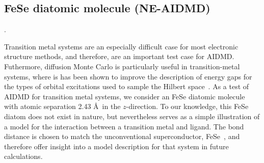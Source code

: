 \subsection{FeSe diatomic molecule (NE-AIDMD)}
.

Transition metal systems are an especially difficult case for most electronic structure methods, and therefore, are an 
important test case for AIDMD. Futhermore, diffusion Monte Carlo is particularly useful in transition-metal systems, where is has been shown to improve the description of energy gaps for the types of orbital excitations used to sample the Hilbert space~\cite{lucas}.
As a test of AIDMD for transition metal systems, we consider an FeSe diatomic molecule with atomic separation 2.43 \AA~in the $z$-direction.
To our knowledge, this FeSe diatom does not exist in nature, but nevertheless serves as a simple illustration of a model for the interaction between a transition metal and ligand.
The bond distance is chosen to match the unconventional superconductor, FeSe~\cite{fese}, and therefore offer insight into a model description for that system in future calculations.


